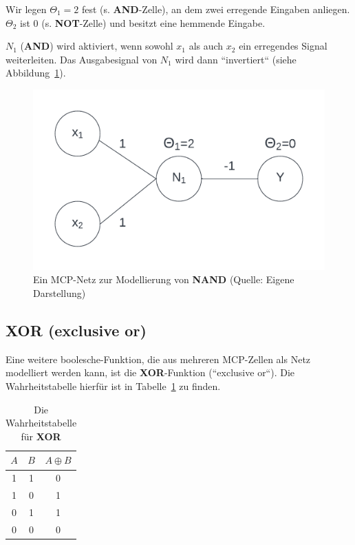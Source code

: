 {Wir legen $\Theta_1 = 2$ fest (s. \textbf{AND}-Zelle), an dem zwei erregende Eingaben anliegen. $\Theta_2$ ist $0$ (s. \textbf{NOT}-Zelle) und besitzt eine hemmende Eingabe.

$N_1$ (\textbf{AND}) wird aktiviert, wenn sowohl $x_1$ als auch $x_2$ ein erregendes Signal weiterleiten. Das Ausgabesignal von $N_1$  wird dann ``invertiert`` (siehe Abbildung~\ref{fig:mcpnand}).


\begin{figure}[h]
    \centering
    \includegraphics{chapters/3. Kuenstliche Neuronen/images/mcpnand}
    \caption{Ein MCP-Netz zur Modellierung von \textbf{NAND} (Quelle: Eigene Darstellung)}
    \label{fig:mcpnand}
\end{figure}


\subsection*{XOR (exclusive or)}

Eine weitere boolesche-Funktion, die aus mehreren MCP-Zellen als Netz modelliert werden kann, ist die \textbf{XOR}-Funktion (``exclusive or``). Die Wahrheitstabelle hierfür ist in Tabelle~\ref{tab:xor} zu finden.

\begin{table} %
    \centering
    \begin{tabular}{c | c | c}
        $A$ & $B$ & $A \oplus B$ \\
        \hline
        1   & 1   & 0           \\
        1   & 0   & 1           \\
        0   & 1   & 1           \\
        0   & 0   & 0           \\
    \end{tabular}
    \caption{Die Wahrheitstabelle für \textbf{XOR}}
    \label{tab:xor}
\end{table}


}
